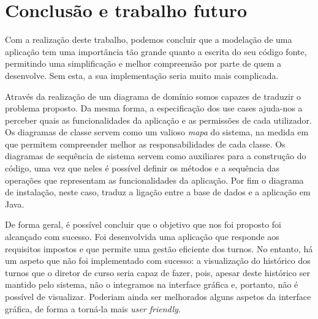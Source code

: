 \documentclass[12pt,a4paper]{report}
\begin{document}
\chapter{Conclusão e trabalho futuro}

Com a realização deste trabalho, podemos concluir que a modelação de uma aplicação tem uma importância tão grande quanto a escrita do seu código fonte, permitindo uma simplificação e melhor compreensão por parte de quem a desenvolve. Sem esta, a sua implementação seria muito mais complicada. 
 
Através da realização de um diagrama de domínio somos capazes de traduzir o problema proposto. Da mesma forma, a especificação dos use cases ajuda-nos a perceber quais as funcionalidades da aplicação e as permissões de cada utilizador. Os diagramas de classe servem como um valioso \textit{mapa} do sistema, na medida em que permitem compreender melhor as responsabilidades de cada classe. Os diagramas de sequência de sistema servem como auxiliares para a construção do código, uma vez que neles é possível definir os métodos e a sequência das operações que representam as funcionalidades da aplicação. Por fim o diagrama de instalação, neste caso, traduz a ligação entre a base de dados e a aplicação em Java.

De forma geral, é possível concluir que o objetivo  que nos foi proposto foi alcançado com sucesso. Foi desenvolvida uma aplicação que responde aos requisitos impostos e que permite uma gestão eficiente dos turnos. No entanto, há um aspeto que não foi implementado com sucesso: a visualização do histórico dos turnos que o diretor de curso seria capaz de fazer, pois, apesar deste histórico ser mantido pelo sistema, não o integramos na interface gráfica e, portanto, não é possível de visualizar.  Poderiam ainda ser melhorados alguns aspetos da interface gráfica, de forma a torná-la mais \textit{user friendly}.
\end{document}
